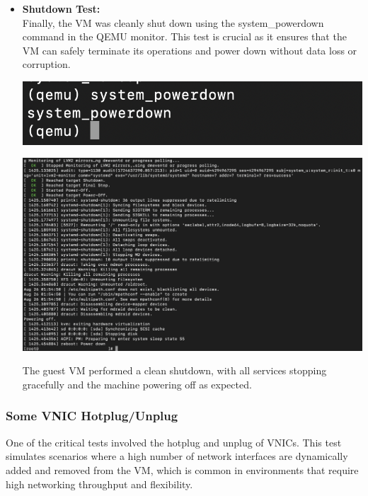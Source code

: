 \begin{itemize}
    \item \textbf{Shutdown Test:}\\
          Finally, the VM was cleanly shut down using the system\_powerdown command in the QEMU monitor. This test is crucial as it ensures that the VM can safely terminate its operations and power down without data loss or corruption.
          \mynewline
          \mynewline
          \begin{center}
              \includegraphics[width=\linewidth]{Images/System-powerdown.png}
              \label{fig:a}
          \end{center}
          \begin{center}
              \includegraphics[width=\linewidth]{Images/Output of shutdowing guest.png}
              \label{fig:areboot}
          \end{center}
          The guest VM performed a clean shutdown, with all services stopping gracefully and the machine powering off as expected.
\end{itemize}

\subsubsection[Some VNIC Hotplug/Unplug]{Some VNIC Hotplug/Unplug}
One of the critical tests involved the hotplug and unplug of VNICs. This test simulates scenarios where a high number of network interfaces are dynamically added and removed from the VM, which is common in environments that require high networking throughput and flexibility.\mynewline

